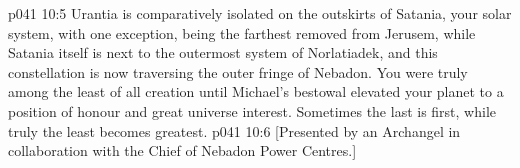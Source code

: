 \vs p041 10:5 \pc Urantia is comparatively isolated on the outskirts of Satania, your solar system, with one exception, being the farthest removed from Jerusem, while Satania itself is next to the outermost system of Norlatiadek, and this constellation is now traversing the outer fringe of Nebadon. You were truly among the least of all creation until Michael’s bestowal elevated your planet to a position of honour and great universe interest. Sometimes the last is first, while truly the least becomes greatest.
\vsetoff
\vs p041 10:6 [Presented by an Archangel in collaboration with the Chief of Nebadon Power Centres.]
\quizlink
